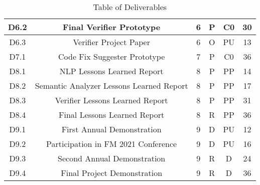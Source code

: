 \begin{table}[hbpt]
\begin{adjustbox}{width=1\textwidth}
\begin{tabular}{ |c|c|c|c|c|c|}
			D6.2 & Final Verifier Prototype & 6 & P & C0 & 30\\
			\hline
			
			D6.3 & Verifier Project Paper & 6 & O & PU & 13\\
			\hline
			
			D7.1 & Code Fix Suggester Prototype & 7 & P & C0 & 36\\
			\hline
			
			D8.1 & NLP Lessons Learned Report & 8 & P & PP & 14\\
			\hline
			
			D8.2 & Semantic Analyzer Lessons Learned Report & 8 & P & PP & 17\\
			\hline
			
			D8.3 & Verifier Lessons Learned Report & 8 & P & PP & 31\\
			\hline
			
			D8.4 & Final Lessons Learned Report & 8 & R & PP & 36\\
			\hline
			
			D9.1 & First Annual Demonstration & 9 & D & PU & 12\\
			\hline
			
			D9.2 & Participation in FM 2021 Conference & 9 & D & PU & 16\\
			\hline
			
			D9.3 & Second Annual Demonstration & 9 & R & D & 24\\
			\hline
			
			D9.4 & Final Project Demonstration & 9 & R & D & 36\\
			\hline
			
		\end{tabular}
	\end{adjustbox}
\caption{Table of Deliverables}
\end{table}